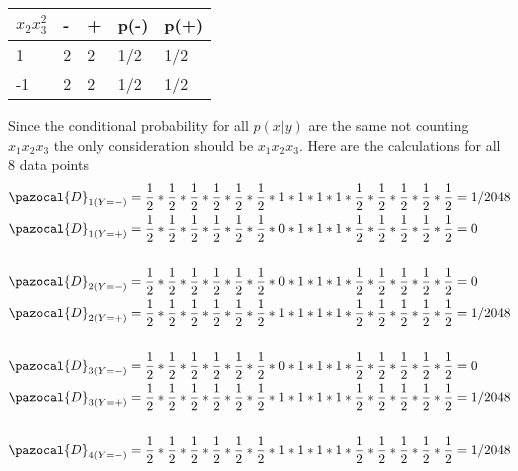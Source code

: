 \documentclass[a4 paper]{article}
\begin{document}
\begin{enumerate}
\begin{table}[!htb]
\begin{minipage}{.50\linewidth}
\begin{tabular}{|l||l|l|l|l|}
			$x_2x^2_3$  & - & + & p(-) & p(+) \\ \hline \hline
			1  &  2 &  2 &  1/2   &   1/2   \\ \hline
			-1 & 2  &  2 &   1/2   &   1/2   \\ \hline
		\end{tabular}
    \end{minipage} %
\end{table}
\linebreak
Since the conditional probability for all $p(x|y)$ are the same not counting $x_1x_2x_3$ the only consideration should be $x_1x_2x_3$. Here are the calculations for all 8 data points 
\begin{equation*}
\begin{split}
\pazocal{D}_{1 (Y=-)} & = \frac{1}{2} *  \frac{1}{2} * \frac{1}{2} * \frac{1}{2} * \frac{1}{2} * \frac{1}{2} * 1 * 1 * 1 * 1 *  \frac{1}{2} *  \frac{1}{2} *  \frac{1}{2} *  \frac{1}{2} *  \frac{1}{2} = 1/2048\\
\pazocal{D}_{1 (Y=+)} & = \frac{1}{2} *  \frac{1}{2} * \frac{1}{2} * \frac{1}{2} * \frac{1}{2} * \frac{1}{2} * 0 * 1 * 1 * 1 *  \frac{1}{2} *  \frac{1}{2} *  \frac{1}{2} *  \frac{1}{2} *  \frac{1}{2} = 0 \\
\\
\pazocal{D}_{2 (Y=-)} & = \frac{1}{2} *  \frac{1}{2} * \frac{1}{2} * \frac{1}{2} * \frac{1}{2} * \frac{1}{2} * 0 * 1 * 1 * 1 *  \frac{1}{2} *  \frac{1}{2} *  \frac{1}{2} *  \frac{1}{2} *  \frac{1}{2} = 0\\
\pazocal{D}_{2 (Y=+)} & = \frac{1}{2} *  \frac{1}{2} * \frac{1}{2} * \frac{1}{2} * \frac{1}{2} * \frac{1}{2} * 1 * 1 * 1 * 1 *  \frac{1}{2} *  \frac{1}{2} *  \frac{1}{2} *  \frac{1}{2} *  \frac{1}{2} = 1/2048 \\
\\
\pazocal{D}_{3 (Y=-)} & = \frac{1}{2} *  \frac{1}{2} * \frac{1}{2} * \frac{1}{2} * \frac{1}{2} * \frac{1}{2} * 0 * 1 * 1 * 1 *  \frac{1}{2} *  \frac{1}{2} *  \frac{1}{2} *  \frac{1}{2} *  \frac{1}{2} = 0\\
\pazocal{D}_{3 (Y=+)} & = \frac{1}{2} *  \frac{1}{2} * \frac{1}{2} * \frac{1}{2} * \frac{1}{2} * \frac{1}{2} * 1 * 1 * 1 * 1 *  \frac{1}{2} *  \frac{1}{2} *  \frac{1}{2} *  \frac{1}{2} *  \frac{1}{2} = 1/2048 \\
\\
\pazocal{D}_{4 (Y=-)} & = \frac{1}{2} *  \frac{1}{2} * \frac{1}{2} * \frac{1}{2} * \frac{1}{2} * \frac{1}{2} * 1 * 1 * 1 * 1 *  \frac{1}{2} *  \frac{1}{2} *  \frac{1}{2} *  \frac{1}{2} *  \frac{1}{2} = 1/2048\\

\end{split}
\end{equation*}
\end{enumerate}
\end{document}
